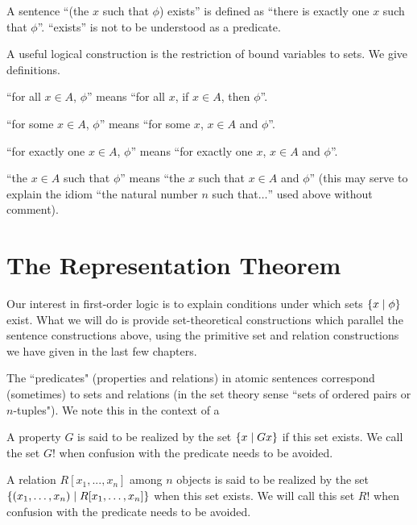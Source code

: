 \begin{definition}
 A sentence ``(the $x$ such that $\phi$) exists'' is
 defined as ``there
is exactly one $x$ such that $\phi$''.  ``exists''
 is not to be understood as a predicate.
\end{definition}

A useful logical construction is the restriction of bound variables to
sets.  We give definitions.

\begin{definition}
 ``for all $x \in A$, $\phi$'' means ``for all $x$,
 if $x \in A$, then $\phi$''.  

 ``for some $x \in A$, $\phi$'' means
 ``for some $x$, $x \in A$ and $\phi$''.  

 ``for exactly one $x \in A$, $\phi$'' means ``for exactly one $x$, $x
 \in A$ and $\phi$''.

 ``the $x\in A$ such that $\phi$'' means ``the $x$ such that $x \in A$
 and $\phi$'' (this may serve to explain the idiom ``the natural number $n$ such that$\ldots$'' used above without comment).
\end{definition}



\section{The Representation Theorem}

Our interest in first-order logic is to explain conditions
under which sets $\{x \mid \phi\}$ exist.  What we will do is provide
set-theoretical constructions which parallel the sentence
constructions above, using the primitive set and relation
constructions we have given in the last few chapters.

The ``predicates" (properties and relations) in atomic sentences correspond (sometimes) to sets and relations
(in the set 
theory sense ``sets of ordered pairs or $n$-tuples").  We
note this in the context of a

\begin{definition}
 A property $G$ is said to be {\upshape realized} by
 the set $\{x \mid Gx\}$ if this set exists.  We call the set $G!$ when
 confusion with the predicate needs to be avoided.  

 A relation $R[x_1,...,x_n]$ among $n$ objects is
 said to be realized by the set $\{(x_1,\ldots,x_n) \mid R[x_1,\ldots,x_n]\}$
 when this set exists.  We will call this set $R!$ when confusion with the
 predicate needs to be avoided.
\end{definition}

